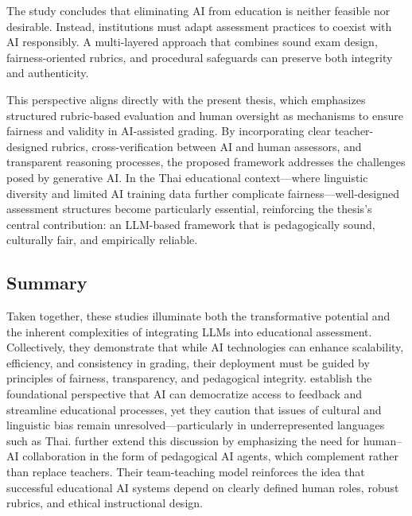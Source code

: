 The study concludes that eliminating AI from education is 
neither feasible nor desirable. Instead, institutions must 
adapt assessment practices to coexist with AI responsibly. A 
multi-layered approach that combines sound exam design, 
fairness-oriented rubrics, and procedural safeguards can 
preserve both integrity and authenticity.

This perspective aligns directly with the present thesis, 
which emphasizes structured rubric-based evaluation and human 
oversight as mechanisms to ensure fairness and validity in 
AI-assisted grading. By incorporating clear teacher-designed 
rubrics, cross-verification between AI and human assessors, 
and transparent reasoning processes, the proposed framework 
addresses the challenges posed by generative AI. In the Thai 
educational context—where linguistic diversity and limited AI 
training data further complicate fairness—well-designed 
assessment structures become particularly essential, 
reinforcing the thesis’s central contribution: an LLM-based 
framework that is pedagogically sound, culturally fair, and 
empirically reliable.


\subsection{Summary}

Taken together, these studies illuminate both the transformative 
potential and the inherent complexities of integrating LLMs 
into educational assessment. Collectively, they demonstrate 
that while AI technologies can enhance scalability, efficiency, 
and consistency in grading, their deployment must be guided by 
principles of fairness, transparency, and pedagogical 
integrity. \cite{Holmes2022} establish the foundational 
perspective that AI can democratize access to feedback and 
streamline educational processes, yet they caution that issues 
of cultural and linguistic bias remain unresolved—particularly 
in underrepresented languages such as Thai. \cite{Lan2024} 
further extend this discussion by emphasizing the need for 
human–AI collaboration in the form of pedagogical AI agents, 
which complement rather than replace teachers. Their 
team-teaching model reinforces the idea that successful 
educational AI systems depend on clearly defined human roles, 
robust rubrics, and ethical instructional design.

